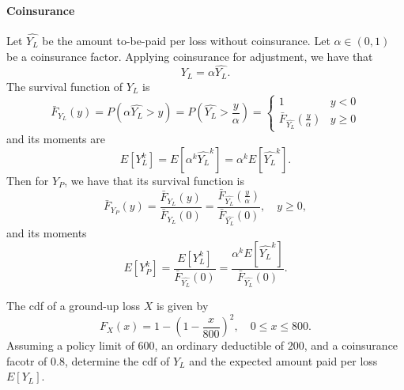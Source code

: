 \documentclass[notoc,notitlepage]{tufte-book}
\begin{document}
\paragraph{Coinsurance} Let $\hat{Y_L}$ be the amount to-be-paid per loss without coinsurance. Let $\alpha \in (0, 1)$ be a coinsurance factor. Applying coinsurance for adjustment, we have that
\begin{equation*}
  Y_L = \alpha \hat{Y_L}.
\end{equation*}
The survival function of $Y_L$ is
\begin{equation*}
  \bar{F}_{Y_L}(y) = P\left( \alpha \hat{Y_L} > y \right) = P\left( \hat{Y_L} > \frac{y}{\alpha} \right) = \begin{cases}
    1 & y < 0 \\
    \bar{F}_{\hat{Y_L}} \left( \frac{y}{\alpha} \right) & y \geq 0
  \end{cases}
\end{equation*}
and its moments are
\begin{equation*}
  E \left[ Y_L^k \right] = E \left[ \alpha^k \hat{Y_L}^k \right] = \alpha^k E \left[ \hat{Y_L}^k \right].
\end{equation*}
Then for $Y_P$, we have that its survival function is
\begin{equation*}
  \bar{F}_{Y_P}(y) = \frac{\bar{F}_{Y_L}(y)}{\bar{F}_{Y_L}(0)} = \frac{\bar{F}_{\hat{Y_L}}\left( \frac{y}{\alpha} \right)}{\bar{F}_{\hat{Y_L}}(0)}, \quad y \geq 0,
\end{equation*}
and its moments
\begin{equation*}
  E \left[ Y_P^k \right] = \frac{E \left[ Y_L^k \right]}{\bar{F}_{\hat{Y_L}}(0)} = \frac{\alpha^k E \left[ \hat{Y_L}^k \right]}{\bar{F}_{\hat{Y_L}}(0)}.
\end{equation*}

\begin{eg}
  The cdf of a ground-up loss $X$ is given by
  \begin{equation*}
    F_X(x) = 1 - \left( 1 - \frac{x}{800} \right)^2, \quad 0 \leq x \leq 800.
  \end{equation*}
  Assuming a policy limit of $600$, an ordinary deductible of $200$, and a coinsurance facotr of $0.8$, determine the cdf of $Y_L$ and the expected amount paid per loss $E\left[ Y_L \right]$.
\end{eg}
\end{document}
